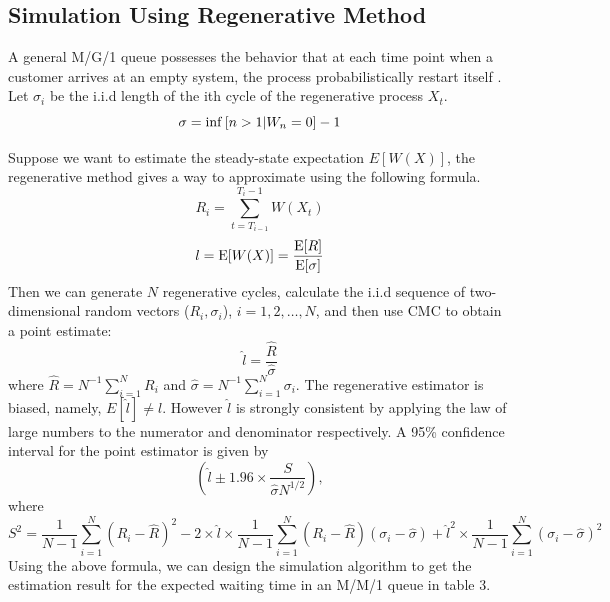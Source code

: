 \documentclass{article}
\begin{document}
\subsection{Simulation Using Regenerative Method}
A general M/G/1 queue possesses the behavior that at each time point when a customer arrives at an empty system, the process probabilistically restart itself \citep{rubinstein2016simulation}. Let $\sigma_i$ be the i.i.d length of the ith cycle of the regenerative process {$X_t$}. 
\begin{equation}
	\sigma = {\rm inf}\left[n>1|W_n=0\right]-1
\end{equation}

Suppose we want to estimate the steady-state expectation $E[W(X)]$, the regenerative method gives a way to approximate using the following formula.
\begin{equation}
	R_i = \sum_{t=T_{i-1}}^{T_i-1}W(X_t)
\end{equation}
\begin{equation}
	l = {\rm E}[W(X)] = \frac{{\rm E}[R]}{{\rm E}[\sigma]}
\end{equation}
Then we can generate $N$ regenerative cycles, calculate the i.i.d sequence of two-dimensional random vectors ($R_i,\sigma_i$), $i=1,2,\dots,N$, and then use CMC to obtain a point estimate:
\begin{equation}
	\hat{l} = \frac{\hat{R}}{\hat{\sigma}}
\end{equation}
where $\hat{R}=N^{-1}\sum_{i=1}^N R_i$ and $\hat{\sigma}=N^{-1}\sum_{i=1}^N \sigma_i$. The regenerative estimator is biased, namely, $E[\hat{l}] \neq l$. However $\hat{l}$ is strongly consistent by applying the law of large numbers to the numerator and denominator respectively. 
A 95\% confidence interval for the point estimator is given by 
\begin{equation}
	(\hat{l} \pm 1.96\times \frac{S}{\hat{\sigma}N^{1/2}}),
\end{equation}
where
\begin{equation}
	S^2 = \frac{1}{N-1}\sum_{i=1}^N (R_i-\hat{R})^2 - 2\times \hat{l} \times  \frac{1}{N-1}\sum_{i=1}^N (R_i-\hat{R})(\sigma_i-\hat{\sigma}) + \hat{l}^2\times \frac{1}{N-1}\sum_{i=1}^N (\sigma_i-\hat{\sigma})^2
\end{equation}
Using the above formula, we can design the simulation algorithm to get the estimation result for the expected waiting time in an M/M/1 queue in table 3.
\end{document}
